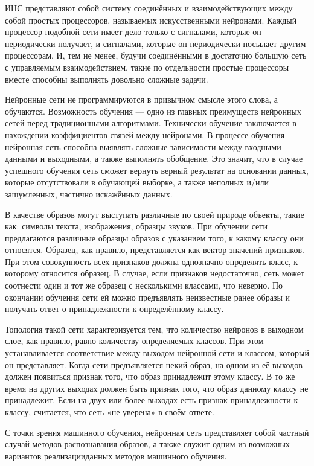 ИНС представляют собой систему соединённых и взаимодействующих между собой простых процессоров, называемых искусственными нейронами. Каждый процессор подобной сети имеет дело только с сигналами, которые он периодически получает, и сигналами, которые он периодически посылает другим процессорам. И, тем не менее, будучи соединёнными в достаточно большую сеть с управляемым взаимодействием, такие по отдельности простые процессоры вместе способны выполнять довольно сложные задачи.

Нейронные сети не программируются в привычном смысле этого слова, а обучаются. Возможность обучения — одно из главных преимуществ нейронных сетей перед традиционными алгоритмами. Технически обучение заключается в нахождении коэффициентов связей между нейронами. В процессе обучения нейронная сеть способна выявлять сложные зависимости между входными данными и выходными, а также выполнять обобщение. Это значит, что в случае успешного обучения сеть сможет вернуть верный результат на основании данных, которые отсутствовали в обучающей выборке, а также неполных и/или зашумленных, частично искажённых данных.

В качестве образов могут выступать различные по своей природе объекты, такие как: символы текста, изображения, образцы звуков. При обучении сети предлагаются различные образцы образов с указанием того, к какому классу они относятся. Образец, как правило, представляется как вектор значений признаков. При этом совокупность всех признаков должна однозначно определять класс, к которому относится образец. В случае, если признаков недостаточно, сеть может соотнести один и тот же образец с несколькими классами, что неверно. По окончании обучения сети ей можно предъявлять неизвестные ранее образы и получать ответ о принадлежности к определённому классу.

Топология такой сети характеризуется тем, что количество нейронов в выходном слое, как правило, равно количеству определяемых классов. При этом устанавливается соответствие между выходом нейронной сети и классом, который он представляет. Когда сети предъявляется некий образ, на одном из её выходов должен появиться признак того, что образ принадлежит этому классу. В то же время на других выходах должен быть признак того, что образ данному классу не принадлежит. Если на двух или более выходах есть признак принадлежности к классу, считается, что сеть «не уверена» в своём ответе.

С точки зрения машинного обучения, нейронная сеть представляет собой частный случай методов распознавания образов, а также служит одним из возможных вариантов реализацииданных методов машинного обучения.

